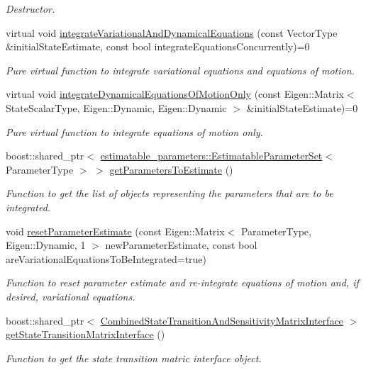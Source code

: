 \begin{DoxyCompactItemize}
\begin{DoxyCompactList}\small\item\em Destructor. \end{DoxyCompactList}\item 
virtual void \hyperlink{classtudat_1_1propagators_1_1VariationalEquationsSolver_a89625f4936bc9e218393ab04f1c5437d}{integrate\+Variational\+And\+Dynamical\+Equations} (const Vector\+Type \&initial\+State\+Estimate, const bool integrate\+Equations\+Concurrently)=0
\begin{DoxyCompactList}\small\item\em Pure virtual function to integrate variational equations and equations of motion. \end{DoxyCompactList}\item 
virtual void \hyperlink{classtudat_1_1propagators_1_1VariationalEquationsSolver_ad54e671becd6caf888e642ad0d50bec8}{integrate\+Dynamical\+Equations\+Of\+Motion\+Only} (const Eigen\+::\+Matrix$<$ State\+Scalar\+Type, Eigen\+::\+Dynamic, Eigen\+::\+Dynamic $>$ \&initial\+State\+Estimate)=0
\begin{DoxyCompactList}\small\item\em Pure virtual function to integrate equations of motion only. \end{DoxyCompactList}\item 
boost\+::shared\+\_\+ptr$<$ \hyperlink{classtudat_1_1estimatable__parameters_1_1EstimatableParameterSet}{estimatable\+\_\+parameters\+::\+Estimatable\+Parameter\+Set}$<$ Parameter\+Type $>$ $>$ \hyperlink{classtudat_1_1propagators_1_1VariationalEquationsSolver_af2559bdd3b95e84ebcefd15477839073}{get\+Parameters\+To\+Estimate} ()
\begin{DoxyCompactList}\small\item\em Function to get the list of objects representing the parameters that are to be integrated. \end{DoxyCompactList}\item 
void \hyperlink{classtudat_1_1propagators_1_1VariationalEquationsSolver_a6141e2cd3c359ebc2c7a57f5d25e6d85}{reset\+Parameter\+Estimate} (const Eigen\+::\+Matrix$<$ Parameter\+Type, Eigen\+::\+Dynamic, 1 $>$ new\+Parameter\+Estimate, const bool are\+Variational\+Equations\+To\+Be\+Integrated=true)
\begin{DoxyCompactList}\small\item\em Function to reset parameter estimate and re-\/integrate equations of motion and, if desired, variational equations. \end{DoxyCompactList}\item 
boost\+::shared\+\_\+ptr$<$ \hyperlink{classtudat_1_1propagators_1_1CombinedStateTransitionAndSensitivityMatrixInterface}{Combined\+State\+Transition\+And\+Sensitivity\+Matrix\+Interface} $>$ \hyperlink{classtudat_1_1propagators_1_1VariationalEquationsSolver_a8b3fe85d9b41b41e8660f28f6f09b6ff}{get\+State\+Transition\+Matrix\+Interface} ()
\begin{DoxyCompactList}\small\item\em Function to get the state transition matric interface object. \end{DoxyCompactList}\end{DoxyCompactItemize}
